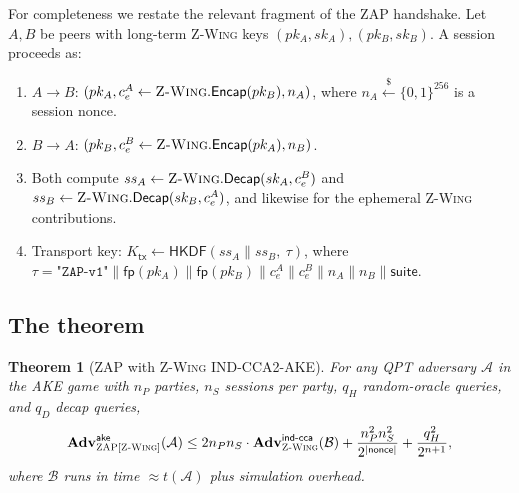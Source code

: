 \documentclass[11pt,a4paper]{article}
\newtheorem{theorem}{Theorem}
\theoremstyle{definition}
\theoremstyle{remark}
\newcommand{\Encap}{\ensuremath{\mathsf{Encap}}}
\newcommand{\Decap}{\ensuremath{\mathsf{Decap}}}
\newcommand{\Adv}{\ensuremath{\mathbf{Adv}}}
\newcommand{\zwing}{\textsc{Z-Wing}}
\newcommand{\zap}{\textsc{ZAP}}
\newcommand{\hkdf}{\ensuremath{\mathsf{HKDF}}}
\newcommand{\BB}{\ensuremath{\{0,1\}}}
\begin{document}
For completeness we restate the relevant fragment of the \zap{} handshake.
Let $A, B$ be peers with long-term \zwing{} keys $(pk_A, sk_A), (pk_B, sk_B)$.
A session proceeds as:
\begin{enumerate}
\item $A \to B$: $(pk_A, c^A_e \gets \zwing.\Encap(pk_B), n_A)$, where
$n_A \xleftarrow{\$} \BB^{256}$ is a session nonce.
\item $B \to A$: $(pk_B, c^B_e \gets \zwing.\Encap(pk_A), n_B)$.
\item Both compute $ss_A \gets \zwing.\Decap(sk_A, c^B_e)$ and
$ss_B \gets \zwing.\Decap(sk_B, c^A_e)$, and likewise for the ephemeral
\zwing{} contributions.
\item Transport key:
$K_{\mathsf{tx}} \gets \hkdf(ss_A \parallel ss_B,\ \tau)$,
where $\tau = \texttt{"ZAP-v1"} \parallel \mathsf{fp}(pk_A) \parallel \mathsf{fp}(pk_B) \parallel c^A_e \parallel c^B_e \parallel n_A \parallel n_B \parallel \mathsf{suite}$.
\end{enumerate}

\subsection{The theorem}

\begin{theorem}[\zap{} with \zwing{} IND-CCA2-AKE]\label{thm:ake}
For any QPT adversary $\mathcal{A}$ in the AKE game with $n_P$ parties,
$n_S$ sessions per party, $q_H$ random-oracle queries, and $q_D$ decap
queries,
\[
\Adv^{\mathsf{ake}}_{\zap[\zwing]}(\mathcal{A}) \le
2 n_P n_S \cdot \Adv^{\mathsf{ind\text{-}cca}}_{\zwing}(\mathcal{B}) +
\frac{n_P^2 n_S^2}{2^{|\mathsf{nonce}|}} +
\frac{q_H^2}{2^{n+1}},
\]
where $\mathcal{B}$ runs in time $\approx t(\mathcal{A})$ plus simulation
overhead.
\end{theorem}
\end{document}
